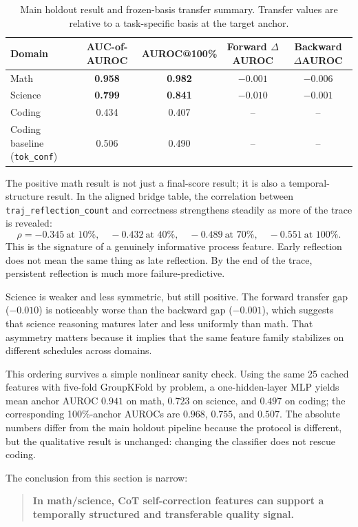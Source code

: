 \documentclass[10pt]{article}
\begin{document}
\begin{table}[t]
\centering
\small
\begin{tabularx}{\linewidth}{lCCCC}
\toprule
Domain & AUC-of-AUROC & AUROC@100\% & Forward $\Delta$AUROC & Backward $\Delta$AUROC \\
\midrule
Math & \textbf{0.958} & \textbf{0.982} & $-0.001$ & $-0.006$ \\
Science & \textbf{0.799} & \textbf{0.841} & $-0.010$ & $-0.001$ \\
Coding & 0.434 & 0.407 & -- & -- \\
Coding baseline (\texttt{tok\_conf}) & 0.506 & 0.490 & -- & -- \\
\bottomrule
\end{tabularx}
\caption{Main holdout result and frozen-basis transfer summary. Transfer values are relative to a task-specific basis at the target anchor.}
\label{tab:positive}
\end{table}

The positive math result is not just a final-score result; it is also a temporal-structure result. In the aligned bridge table, the correlation between \texttt{traj\_reflection\_count} and correctness strengthens steadily as more of the trace is revealed:
\[
\rho = -0.345 \ \text{at 10\%},\quad
-0.432 \ \text{at 40\%},\quad
-0.489 \ \text{at 70\%},\quad
-0.551 \ \text{at 100\%}.
\]
This is the signature of a genuinely informative process feature. Early reflection does not mean the same thing as late reflection. By the end of the trace, persistent reflection is much more failure-predictive.

Science is weaker and less symmetric, but still positive. The forward transfer gap ($-0.010$) is noticeably worse than the backward gap ($-0.001$), which suggests that science reasoning matures later and less uniformly than math. That asymmetry matters because it implies that the same feature family stabilizes on different schedules across domains.

This ordering survives a simple nonlinear sanity check. Using the same 25 cached features with five-fold GroupKFold by problem, a one-hidden-layer MLP yields mean anchor AUROC $0.941$ on math, $0.723$ on science, and $0.497$ on coding; the corresponding 100\%-anchor AUROCs are $0.968$, $0.755$, and $0.507$. The absolute numbers differ from the main holdout pipeline because the protocol is different, but the qualitative result is unchanged: changing the classifier does not rescue coding.

The conclusion from this section is narrow:
\begin{quote}
\textbf{In math/science, CoT self-correction features can support a temporally structured and transferable quality signal.}
\end{quote}
\end{document}
